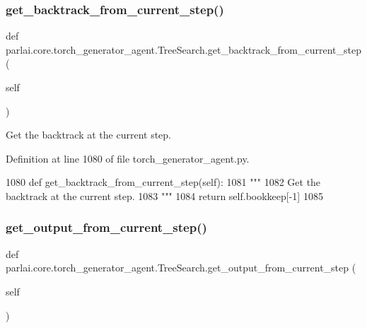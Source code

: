 \subsubsection{\texorpdfstring{get\+\_\+backtrack\+\_\+from\+\_\+current\+\_\+step()}{get\_backtrack\_from\_current\_step()}}
{\footnotesize\ttfamily def parlai.\+core.\+torch\+\_\+generator\+\_\+agent.\+Tree\+Search.\+get\+\_\+backtrack\+\_\+from\+\_\+current\+\_\+step (\begin{DoxyParamCaption}\item[{}]{self }\end{DoxyParamCaption})}

\begin{DoxyVerb}Get the backtrack at the current step.
\end{DoxyVerb}
 

Definition at line 1080 of file torch\+\_\+generator\+\_\+agent.\+py.


\begin{DoxyCode}
1080     \textcolor{keyword}{def }get\_backtrack\_from\_current\_step(self):
1081         \textcolor{stringliteral}{"""}
1082 \textcolor{stringliteral}{        Get the backtrack at the current step.}
1083 \textcolor{stringliteral}{        """}
1084         \textcolor{keywordflow}{return} self.bookkeep[-1]
1085 
\end{DoxyCode}
\mbox{\label{classparlai_1_1core_1_1torch__generator__agent_1_1TreeSearch_a929ecbf60f149968caae5a0a6908d67a}} 
\subsubsection{\texorpdfstring{get\+\_\+output\+\_\+from\+\_\+current\+\_\+step()}{get\_output\_from\_current\_step()}}
{\footnotesize\ttfamily def parlai.\+core.\+torch\+\_\+generator\+\_\+agent.\+Tree\+Search.\+get\+\_\+output\+\_\+from\+\_\+current\+\_\+step (\begin{DoxyParamCaption}\item[{}]{self }\end{DoxyParamCaption})}

